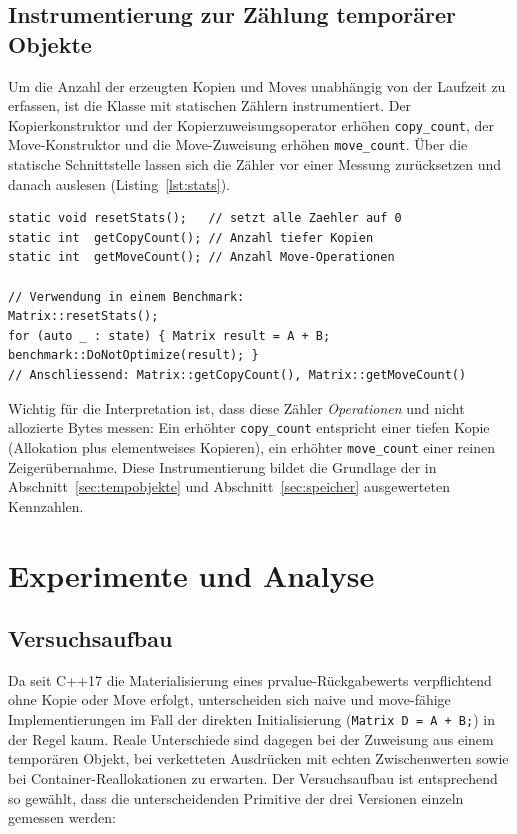 \documentclass[10pt,a4paper]{article}
\begin{document}
\subsection{Instrumentierung zur Zählung temporärer Objekte}
\label{sec:instrumentierung}

Um die Anzahl der erzeugten Kopien und Moves unabhängig von der Laufzeit zu
erfassen, ist die Klasse mit statischen Zählern instrumentiert. Der
Kopierkonstruktor und der Kopierzuweisungsoperator erhöhen \texttt{copy\_count},
der Move-Konstruktor und die Move-Zuweisung erhöhen \texttt{move\_count}. Über
die statische Schnittstelle lassen sich die Zähler vor einer Messung
zurücksetzen und danach auslesen (Listing~\ref{lst:stats}).

\begin{lstlisting}[caption={Statische Zaehler zur Messung von Kopien und Moves}, label={lst:stats}]
static void resetStats();   // setzt alle Zaehler auf 0
static int  getCopyCount(); // Anzahl tiefer Kopien
static int  getMoveCount(); // Anzahl Move-Operationen

// Verwendung in einem Benchmark:
Matrix::resetStats();
for (auto _ : state) { Matrix result = A + B; benchmark::DoNotOptimize(result); }
// Anschliessend: Matrix::getCopyCount(), Matrix::getMoveCount()
\end{lstlisting}

Wichtig für die Interpretation ist, dass diese Zähler \emph{Operationen} und
nicht allozierte Bytes messen: Ein erhöhter \texttt{copy\_count} entspricht
einer tiefen Kopie (Allokation plus elementweises Kopieren), ein erhöhter
\texttt{move\_count} einer reinen Zeigerübernahme. Diese Instrumentierung bildet
die Grundlage der in Abschnitt~\ref{sec:tempobjekte} und
Abschnitt~\ref{sec:speicher} ausgewerteten Kennzahlen.

\section{Experimente und Analyse}
\label{sec:experimente}

\subsection{Versuchsaufbau}
\label{sec:versuchsaufbau}

Da seit C++17 die Materialisierung eines prvalue-Rückgabewerts verpflichtend
ohne Kopie oder Move erfolgt, unterscheiden sich naive und move-fähige
Implementierungen im Fall der direkten Initialisierung (\texttt{Matrix D = A + B;})
in der Regel kaum. Reale Unterschiede sind dagegen bei der Zuweisung aus einem
temporären Objekt, bei verketteten Ausdrücken mit echten Zwischenwerten sowie
bei Container-Reallokationen zu erwarten. Der Versuchsaufbau ist entsprechend so
gewählt, dass die unterscheidenden Primitive der drei Versionen einzeln
gemessen werden:
\end{document}
